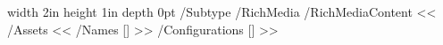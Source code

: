 

\paperintro

\leavevmode\pdfannot width 2in height 1in depth 0pt {/Subtype /RichMedia
  /RichMediaContent << /Assets << /Names [] >> /Configurations [] >>}

